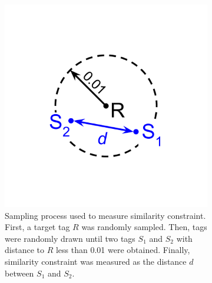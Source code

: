 \begin{figure}[!htbp]
\begin{center}

\begin{minipage}{\linewidth}
\begin{subfigure}[b]{\linewidth}
\begin{minipage}{0.5\textwidth}
\begin{center}
\includegraphics[width=0.5\linewidth,trim=5cm 5cm 5cm 5cm, clip]{img/dimensionality-statistic}
\end{center}
\end{minipage}%
\begin{minipage}{0.5\textwidth}
\caption{
Sampling process used to measure similarity constraint.
First, a target tag $R$ was randomly sampled.
Then, tags were randomly drawn until two tags $S_1$ and $S_2$ with distance to $R$ less than 0.01 were obtained.
Finally, similarity constraint was measured as the distance $d$ between $S_1$ and $S_2$.
}
\label{fig:dimensionality_measure}
\end{minipage}
\end{subfigure}
\end{minipage}
\begin{subfigure}[b]{\linewidth}
\begin{minipage}{0.6\linewidth}

\end{minipage}
\end{subfigure}
\end{center}
\end{figure}
